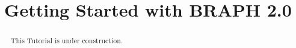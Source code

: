 \documentclass[justified]{tufte-handout}
\title{Getting Started with BRAPH 2.0}
\begin{document}
\maketitle

\begin{abstract}
\noindent
This Tutorial is under construction.
\end{abstract}
\end{document}
